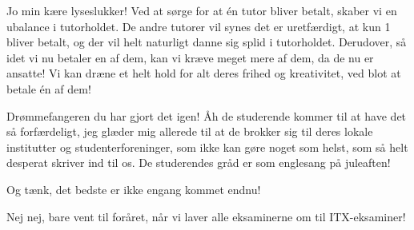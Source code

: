 \documentclass[a4paper,11pt]{article}
\begin{document}
\begin{sketch}
 Jo min kære lyseslukker! Ved at sørge for at én tutor bliver betalt, skaber vi en ubalance i tutorholdet. De andre tutorer vil synes det er uretfærdigt, at kun 1 bliver betalt, og der vil helt naturligt danne sig splid i tutorholdet. Derudover, så idet vi nu betaler en af dem, kan vi kræve meget mere af dem, da de nu er ansatte! Vi kan dræne et helt hold for alt deres frihed og kreativitet, ved blot at betale én af dem! 

 Drømmefangeren du har gjort det igen! Åh de studerende kommer til at have det så forfærdeligt, jeg glæder mig allerede til at de brokker sig til deres lokale institutter og studenterforeninger, som ikke kan gøre noget som helst, som så helt desperat skriver ind til os. De studerendes gråd er som englesang på juleaften! 

 Og tænk, det bedste er ikke engang kommet endnu!

 Nej nej, bare vent til foråret, når vi laver alle eksaminerne om til ITX-eksaminer!


\end{sketch}
\end{document}
